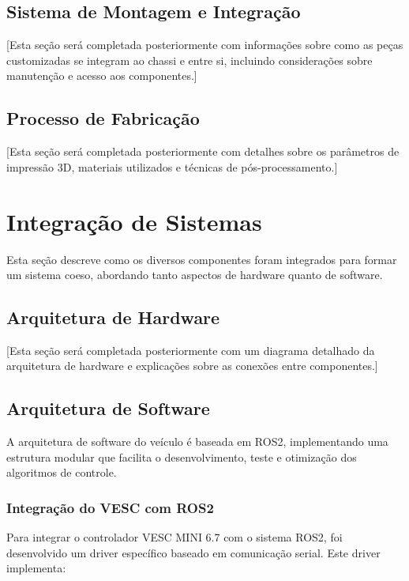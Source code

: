 \subsection{Sistema de Montagem e Integração}

[Esta seção será completada posteriormente com informações sobre como as peças customizadas se integram ao chassi e entre si, incluindo considerações sobre manutenção e acesso aos componentes.]

\subsection{Processo de Fabricação}

[Esta seção será completada posteriormente com detalhes sobre os parâmetros de impressão 3D, materiais utilizados e técnicas de pós-processamento.]

\section{Integração de Sistemas}

Esta seção descreve como os diversos componentes foram integrados para formar
um sistema coeso, abordando tanto aspectos de hardware quanto de software.

\subsection{Arquitetura de Hardware}

[Esta seção será completada posteriormente com um diagrama detalhado da arquitetura de hardware e explicações sobre as conexões entre componentes.]

\subsection{Arquitetura de Software}

A arquitetura de software do veículo é baseada em ROS2, implementando uma
estrutura modular que facilita o desenvolvimento, teste e otimização dos
algoritmos de controle.

\subsubsection{Integração do VESC com ROS2}

Para integrar o controlador VESC MINI 6.7 com o sistema ROS2, foi desenvolvido
um driver específico baseado em comunicação serial. Este driver implementa:

